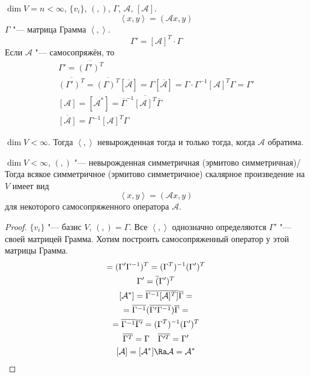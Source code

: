 \begin{exmp}
	$\dim V = n < \infty$, $\{v_i\}$, $(,)$, $\Gamma$, $\mathcal A$, $[\mathcal A]$.
	\[ \left<x, y\right> = (\mathcal A x, y) \]
	$\Gamma$ "--- матрица Грамма $\left<,\right>$.
	\[ \Gamma' = [\mathcal A]^T \cdot \Gamma \]
	Если $\mathcal A$ "--- самосопряжён, то
	\begin{gather*}
		\Gamma' = \overline{(\Gamma')^T} \\
		\overline{(\Gamma')^T}
		= \overline{(\Gamma)^T} [\overline{\mathcal A}]
		= \Gamma[\overline{\mathcal A}] = \Gamma \cdot \Gamma^{-1}[\mathcal A]^T\Gamma = \Gamma' \\
		[\mathcal A]
		= [\mathcal A^*]
		= \overline{\Gamma}^{-1} \overline{[\mathcal A]^T} \overline{\Gamma} \\
		\overline{[\mathcal A]} = \Gamma^{-1} [\mathcal A]^T \Gamma
	\end{gather*}
\end{exmp}

\begin{conseq}
	$\dim V < \infty$.
	Тогда $\left<,\right>$ невырожденная тогда и только тогда, когда $\mathcal A$ обратима.
\end{conseq}

\begin{conseq}
	$\dim V < \infty$,
	$(,)$ "--- невырожденная симметричная (эрмитово симметричная)/
	Тогда всякое симметричное (эрмитово симметричное) скалярное произведение на $V$ имеет вид
	\[ \left<x, y\right> = (\mathcal A x, y) \]
	для некоторого самосопряженного оператора $\mathcal A$.
\end{conseq}
\begin{proof}
	$\{v_i\}$ "--- базис $V$, $(,) = \Gamma$.
	Все $\left<,\right>$ однозначно определяются $\Gamma'$ "--- своей матрицей Грамма.
	Хотим построить самосопряженный оператор у этой матрицы Грамма.
	\begin{gather*}
		[\mathcal A] = (\Gamma' \Gamma^{-1})^T = (\Gamma^T)^{-1} (\Gamma')^T \\
		\Gamma' = \overline(\Gamma')^T \\
		[\mathcal A^*] = \overline{\Gamma^{-1}} \overline{[\mathcal A]^T]} \overline{\Gamma} = \\
		= \overline{\Gamma^{-1}} (\overline{\Gamma' \Gamma^{-1}}) \overline{\Gamma} = \\
		= \overline{\Gamma^{-1}} \overline{\Gamma'} = (\Gamma^T)^{-1}(\Gamma')^T \\
		\overline{\Gamma^T} = \Gamma \quad \overline{\Gamma'^T} = \Gamma' \\
		[\mathcal A] = [\mathcal A^*] \Ra \mathcal A = \mathcal A^*
	\end{gather*}
\end{proof}
